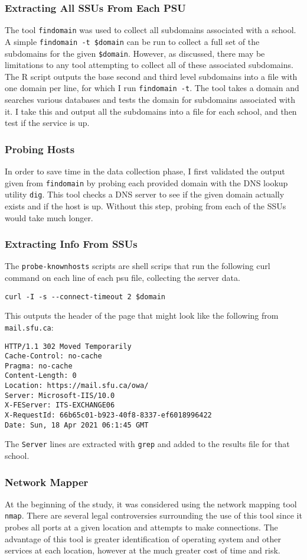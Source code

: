 \documentclass{article}
\theoremstyle{definition}
\begin{document}
\subsubsection{Extracting All SSUs From Each PSU}
The tool \texttt{findomain} was used to collect all subdomains associated with a school.
A simple \texttt{findomain -t \$domain} can be run to collect a full set of the subdomains
for the given \texttt{\$domain}. However, as discussed, there may be limitations to any tool
attempting to collect all of these associated subdomains.
The R script outputs the base second and third level subdomains
into a file with one domain per line, for which I run \texttt{findomain -t}.
The tool takes a domain and searches various databases and tests the domain
for subdomains associated with it. I take this and output all the subdomains
into a file for each school, and then test if the service is up.

\subsubsection{Probing Hosts}
In order to save time in the data collection phase, I first validated the output
given from \texttt{findomain} by probing each provided domain with the
DNS lookup utility \texttt{dig}. This tool checks a DNS server to see if the
given domain actually exists and if the host is up. Without this step,
probing from each of the SSUs would take much longer.

\subsubsection{Extracting Info From SSUs}
The \texttt{probe-knownhosts} scripts are shell scrips
that run the following curl command on each line of each
psu file, collecting the server data.
\begin{lstlisting}
curl -I -s --connect-timeout 2 $domain
\end{lstlisting}
This outputs the header of the page that might look like the following from \texttt{mail.sfu.ca}:
\begin{lstlisting}
HTTP/1.1 302 Moved Temporarily
Cache-Control: no-cache
Pragma: no-cache
Content-Length: 0
Location: https://mail.sfu.ca/owa/
Server: Microsoft-IIS/10.0
X-FEServer: ITS-EXCHANGE06
X-RequestId: 66b65c01-b923-40f8-8337-ef6018996422
Date: Sun, 18 Apr 2021 06:1:45 GMT
\end{lstlisting}
The \texttt{Server} lines are extracted with \texttt{grep} and added to the results file for that school.

\subsubsection{Network Mapper}
At the beginning of the study, it was considered using the network mapping tool \texttt{nmap}.
There are several legal controversies surrounding the use of this tool since it probes all ports at
a given location and attempts to make connections. The advantage of this tool is greater identification
of operating system and other services at each location, however at the much greater cost of time and
risk.
\end{document}
